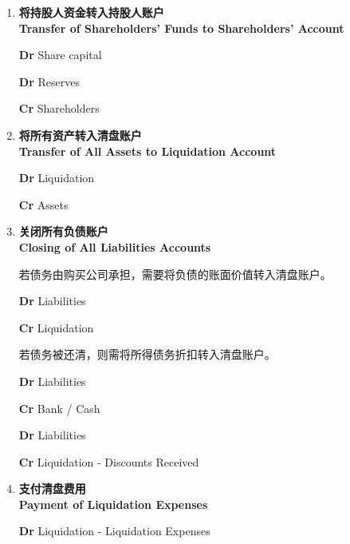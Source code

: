 \documentclass{article}
\begin{document}
\begin{enumerate}
    \item \textbf{将持股人资金转入持股人账户\\Transfer of Shareholders' Funds to Shareholders' Account}
    \begin{mdframed}[backgroundcolor=gray!10]
    \textbf{Dr} Share capital

    \textbf{Dr} Reserves

    \hspace{1.7em}\textbf{Cr} Shareholders
    \end{mdframed}

    \item \textbf{将所有资产转入清盘账户\\Transfer of All Assets to Liquidation Account}
    \begin{mdframed}[backgroundcolor=gray!10]
    \textbf{Dr} Liquidation

    \hspace{1.7em}\textbf{Cr} Assets
    \end{mdframed}

    \item \textbf{关闭所有负债账户\\Closing of All Liabilities Accounts}
    
    若债务由购买公司承担，需要将负债的账面价值转入清盘账户。
    \begin{mdframed}[backgroundcolor=gray!10]
    \textbf{Dr} Liabilities

    \hspace{1.7em}\textbf{Cr} Liquidation
    \end{mdframed}

    若债务被还清，则需将所得债务折扣转入清盘账户。
    \begin{mdframed}[backgroundcolor=gray!10]
    \textbf{Dr} Liabilities

    \hspace{1.7em}\textbf{Cr} Bank / Cash
    \end{mdframed}
    \begin{mdframed}[backgroundcolor=gray!10]
    \textbf{Dr} Liabilities

    \hspace{1.7em}\textbf{Cr} Liquidation - Discounts Received
    \end{mdframed}

    \item \textbf{支付清盘费用\\Payment of Liquidation Expenses}
    \begin{mdframed}[backgroundcolor=gray!10]
    \textbf{Dr} Liquidation - Liquidation Expenses


\end{mdframed}
\end{enumerate}
\end{document}
